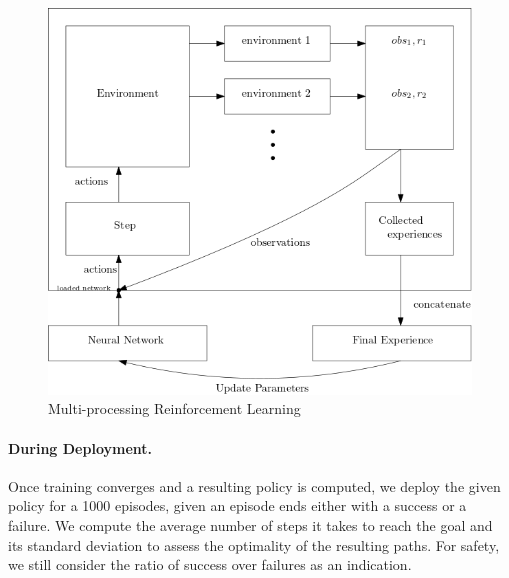\begin{figure}[H]
    \centering
    \includegraphics[scale=0.4]{figures/multiprocess.png}
    \caption{Multi-processing Reinforcement Learning}
    \label{fig:multiprocess}
  \end{figure}

  \paragraph{During Deployment.} Once training converges and a resulting policy is computed, we deploy the given policy for a 1000 episodes, given an episode ends either 
  with a success or a failure. We compute the average number of steps it takes to reach the goal and its standard deviation to assess the optimality of the resulting paths. 
  For safety, we still consider the ratio of success over failures as an indication. 
  
